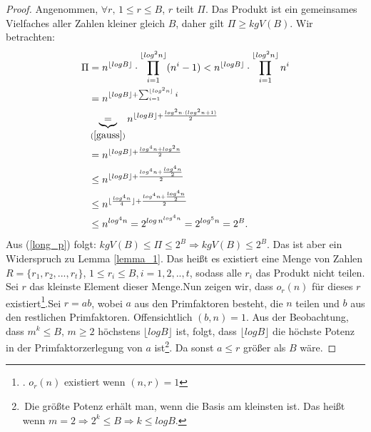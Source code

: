 \documentclass[12pt,oneside]{article}
\theoremstyle{remark}
\theoremstyle{definition}
\begin{document}
\begin{proof}
Angenommen, $\forall r, \, 1 \leq r \leq B$, $r$ teilt $\Pi$. Das Produkt ist ein gemeinsames Vielfaches aller Zahlen kleiner gleich $B$, daher gilt $\Pi \geq kgV(B)$.\newline
Wir betrachten:
\begin{equation}\label{long_p}
    \begin{split}
        \begin{aligned}
            \Pi &= n^{\lfloor log B \rfloor } \cdot \prod_{i = 1}^{\lfloor log^2 n \rfloor} (n^i - 1)
                < n^{\lfloor log B \rfloor } \cdot \prod_{i = 1}^{\lfloor log^2 n \rfloor} n^i \\
                &= n^{\lfloor log B \rfloor + \sum_{i = 1}^{\lfloor log^2 n \rfloor } i}\\ 
                &\underbrace{=}_{(\ref{gauss})} n^{\lfloor log B \rfloor + \frac{log^2 n \cdot (log^2 n + 1)}{2}}  \\
                &= n^{\lfloor log B \rfloor + \frac{log^4 n + log^2 n}{2}}\\
                & \leq n^{\lfloor log B \rfloor + \frac{log^4 n + \frac{log^4 n}{2}}{2}}\\
                & \leq n^{\lfloor \frac{log^4 n}{4} \rfloor + \frac{log^4 n + \frac{log^4 n}{2}}{2}}\\
                &\leq n^{log^4 n} = 2^{log \, n^{log^4 n}} = 2^{log^5 n} = 2^{B}.
        \end{aligned}
    \end{split}
\end{equation}
Aus (\ref{long_p}) folgt: $kgV(B) \leq \Pi \leq 2^B \Rightarrow kgV(B) \leq 2^B$. Das ist aber ein Widerspruch zu Lemma \ref{lemma_1}. Das heißt es existiert eine Menge von Zahlen $R = \{r_{1},r_{2},...,r_{t}\}$, $ 1 \leq r_i \leq B$,$\, i = 1,2, ..,t$, sodass alle $r_{i}$ das Produkt nicht teilen. Sei $r$ das kleinste Element dieser Menge.\newline\newline Nun zeigen wir, dass $o_{r}(n)$ für dieses $r$ existiert\footnote{. $o_{r}(n)$ existiert wenn $(n,r) = 1$}.\newline\newline Sei $r = ab $, wobei $a$ aus den Primfaktoren besteht, die $n$ teilen und $b$ aus den restlichen Primfaktoren. Offensichtlich $(b,n) = 1$. Aus der Beobachtung, dass $m^k \leq B, \, m \geq 2$ höchstens $\lfloor log B \rfloor$ ist, folgt, dass $ \lfloor log B \rfloor$  die höchste Potenz in der Primfaktorzerlegung von $a$ ist\footnote{ $ \,$Die größte Potenz erhält man, wenn die Basis am kleinsten ist. Das heißt wenn $m = 2 \Rightarrow 2^k \leq B \Rightarrow k \leq log B $.}. Da sonst $a \leq r$ größer als $B$ wäre.\newline\newline

\end{proof}
\end{document}
